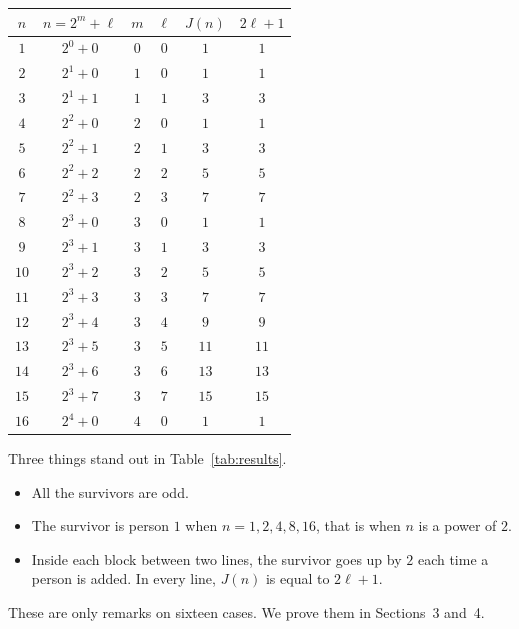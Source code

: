 \begin{center}
\renewcommand{\arraystretch}{1.0}
\begin{tabular}{|c|c|c|c|c|c|}
\hline
$n$ & $n=2^m+\ell$ & $m$ & $\ell$ & $J(n)$ & $2\ell+1$\\ \hline
$1$ & $2^{0}+0$ & $0$ & $0$ & $1$ & $1$\\
\hline
$2$ & $2^{1}+0$ & $1$ & $0$ & $1$ & $1$\\
$3$ & $2^{1}+1$ & $1$ & $1$ & $3$ & $3$\\
\hline
$4$ & $2^{2}+0$ & $2$ & $0$ & $1$ & $1$\\
$5$ & $2^{2}+1$ & $2$ & $1$ & $3$ & $3$\\
$6$ & $2^{2}+2$ & $2$ & $2$ & $5$ & $5$\\
$7$ & $2^{2}+3$ & $2$ & $3$ & $7$ & $7$\\
\hline
$8$ & $2^{3}+0$ & $3$ & $0$ & $1$ & $1$\\
$9$ & $2^{3}+1$ & $3$ & $1$ & $3$ & $3$\\
$10$ & $2^{3}+2$ & $3$ & $2$ & $5$ & $5$\\
$11$ & $2^{3}+3$ & $3$ & $3$ & $7$ & $7$\\
$12$ & $2^{3}+4$ & $3$ & $4$ & $9$ & $9$\\
$13$ & $2^{3}+5$ & $3$ & $5$ & $11$ & $11$\\
$14$ & $2^{3}+6$ & $3$ & $6$ & $13$ & $13$\\
$15$ & $2^{3}+7$ & $3$ & $7$ & $15$ & $15$\\
\hline
$16$ & $2^{4}+0$ & $4$ & $0$ & $1$ & $1$\\
\hline
\end{tabular}
\label{tab:results}
\end{center}

Three things stand out in Table~\ref{tab:results}.
\begin{itemize}
  \item All the survivors are odd.
  \item The survivor is person $1$ when $n=1,2,4,8,16$, that is when $n$ is a
        power of $2$.
  \item Inside each block between two lines, the survivor goes up by $2$ each
        time a person is added. In every line, $J(n)$ is equal to $2\ell+1$.
\end{itemize}
These are only remarks on sixteen cases. We prove them in Sections~3
and~4.
